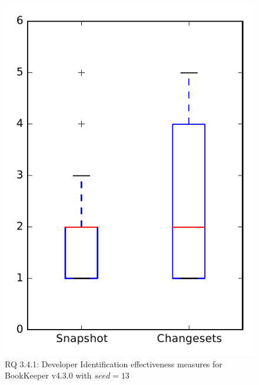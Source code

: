 
\begin{figure}
\centering
\includegraphics[height=0.4\textheight]{figures/dit_seed/rq1_bookkeeper_13}
\caption{RQ 3.4.1: Developer Identification effectiveness measures for BookKeeper v4.3.0 with $seed=13$}
\label{fig:dit_seed:rq1:bookkeeper}
\end{figure}
